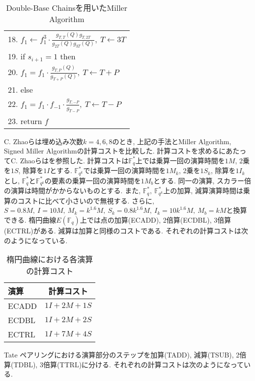 \begin{table}[htbp]
\begin{center}
\begin{tabular}{|l|}
     18. \quad \quad \quad \quad \quad $f_1 \gets f_1^3 \cdot \frac{g_{T,T}(Q)g_{T,2T}}{g_{2T}(Q)g_{3T}(Q)},\ T \gets 3T$\\
     19. \quad if $s_{i + 1} = 1$ then\\
     20. \quad \quad $f_1 = f_1 \cdot \frac{g_{T,P}(Q)}{g_{T + P}(Q)},\ T \gets T + P$\\
     21. \quad else\\
     22. \quad \quad $f_1 = f_1 \cdot f_{-1} \cdot \frac{g_{T,-P}}{g_{T - P}},\ T \gets T - P$\\
     23. \quad return $f$\\
     \hline
  \end{tabular}
 \end{center}
 \caption{Double-Base Chainsを用いたMiller Algorithm}
\end{table}
\clearpage
\par
C. Zhaoらは埋め込み次数$k=4,6,8$のとき, 上記の手法とMiller Algorithm, Signed Miller Algorithmの計算コストを比較した. 
計算コストを求めるにあたってC. Zhaoらは\cite{ECT}を参照した. 計算コストは$\mathbb{F}_q^\ast$上では乗算一回の演算時間を$1M$, 2乗を$1S$, 除算を$1I$とする. $\mathbb{F}_{q^k}^\ast$では乗算一回の演算時間を$1M_k$, 2乗を$1S_k$, 除算を$1I_k$とし, $\mathbb{F}_q^\ast と\mathbb{F}_{q^k}^\ast$の要素の乗算一回の演算時間を$1M_b$とする. 同一の演算, スカラー倍の演算は時間がかからないものとする. また, $\mathbb{F}_q^\ast,\ \mathbb{F}_{q^k}^\ast$上の加算, 減算演算時間は乗算のコストに比べて小さいので無視する. さらに, $S = 0.8M,\ I = 10M,\ M_k = k^{1.6}M,\ S_k = 0.8k^{1.6}M,\ I_k = 10k^{1.6}M,\ M_b = kM$と換算できる. 
楕円曲線$E(\mathbb{F}_q)$上では点の加算(ECADD), 2倍算(ECDBL), 3倍算(ECTRL)がある. 減算は加算と同様のコストである. それぞれの計算コストは次のようになっている. 
\begin{table}[htbp]
 \begin{center}
  \begin{tabular}{|l|c|}
  \hline
  演算 & 計算コスト \\
  \hline
  ECADD & $1I + 2M + 1S$ \\
  \hline
  ECDBL & $1I + 2M + 2S$ \\
  \hline
  ECTRL & $1I + 7M + 4S$ \\
  \hline
  \end{tabular}
 \end{center}
 \caption{楕円曲線における各演算の計算コスト}
\end{table}
\par
Tate ペアリングにおける演算部分のステップを加算(TADD), 減算(TSUB), 2倍算(TDBL), 3倍算(TTRL)に分ける. それぞれの計算コストは次のようになっている. 
